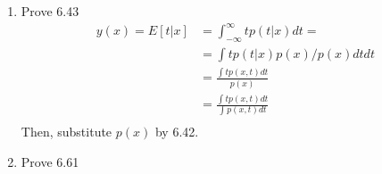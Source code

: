 \documentclass[10.5pt]{article}
\begin{document}
\begin{enumerate}
\begin{itemize}
    \end{itemize} 
    \item Prove 6.43
    \begin{align}
        y(x)=E[t|x]&=\int_{-\infty}^{\infty}tp(t|x)dt=\\
        &=\int tp(t|x)p(x)/p(x)dtdt\\
        &=\frac{\int tp(x,t)dt}{p(x)}\\
        &=\frac{\int tp(x,t)dt}{\int p(x,t)dt}\\
    \end{align}
    Then, substitute $p(x)$ by 6.42. 
    \item Prove 6.61
    
    
\end{enumerate}





 

\end{document}
